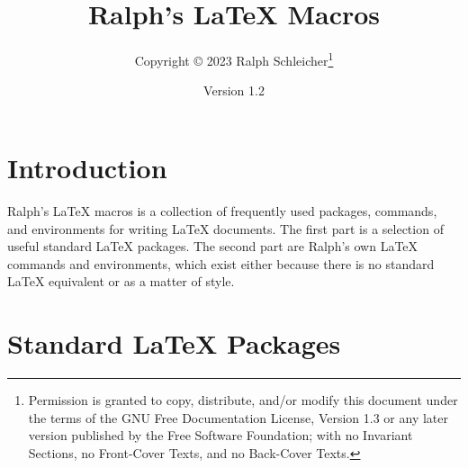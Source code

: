 \documentclass{scrartcl}
\title{Ralph's \LaTeX{} Macros}
\author{Copyright \copyright{} 2023 Ralph Schleicher\footnote{%
Permission is granted to copy, distribute, and/or modify this
document under the terms of the GNU Free Documentation License,
Version 1.3 or any later version published by the Free Software
Foundation; with no Invariant Sections, no Front-Cover Texts,
and no Back-Cover Texts.}}
\date{Version 1.2}
\begin{document}
\maketitle
\tableofcontents


\section{Introduction}

Ralph's \LaTeX{} macros is a collection of frequently used packages,
commands, and environments for writing \LaTeX{} documents.  The first
part is a selection of useful standard \LaTeX{} packages.  The second
part are Ralph's own \LaTeX{} commands and environments, which exist
either because there is no standard \LaTeX{} equivalent or as a matter
of style.


\section{Standard \LaTeX{} Packages}
\end{document}
